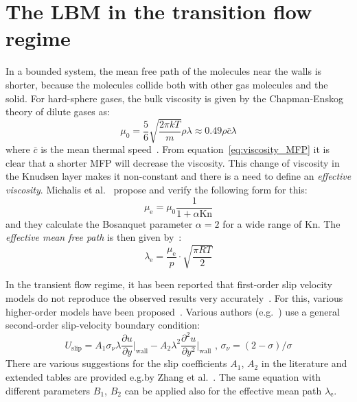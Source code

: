 \section{The LBM in the transition flow regime}
In a bounded system, the mean free path of the molecules near the walls is
shorter, because the molecules collide both with other gas molecules and the solid.
For hard-sphere gases, the bulk viscosity is given by the
Chapman-Enskog theory of dilute gases as:
\begin{equation}
 \mu_0 = \frac{5}{6} \sqrt{\frac{2\pi k T}{m}} \rho \lambda \approx 0.49 \rho \bar{c} \lambda
 \label{eq:viscosity_MFP}
\end{equation}
where $\bar{c}$ is the mean thermal speed~\cite{Michalis2010}. 
From equation~\ref{eq:viscosity_MFP} it is clear that a shorter MFP will decrease the viscosity.
This change of viscosity in the Knudsen layer makes it non-constant and there is a need
to define an \textit{effective viscosity}. Michalis et al.~\cite{Michalis2010} propose
and verify the following form for this:
\begin{equation}
 \mu_\mathrm{e} = \mu_0 \frac{1}{1 + \alpha \mathrm{Kn}}
\end{equation}
and they calculate the Bosanquet parameter $\alpha=2$ for a wide range of $\mathrm{Kn}$.
The \textit{effective mean free path} is then given by~\cite{Li2011}:
\begin{equation}
 \lambda_\mathrm{e} = \frac{\mu_\mathrm{e}}{p} \cdot \sqrt{\frac{\pi R T}{2}}
\end{equation}

In the transient flow regime, it has been reported that first-order slip velocity
models do not reproduce the observed results very accurately~\cite{Barber2006}.
For this, various higher-order models have been proposed~\cite{Zhang2012}.
Various authors (e.g.~\cite{Li2011, Neumann2012}) use a general second-order
slip-velocity boundary condition:
\begin{equation}
 U_\mathrm{slip} = A_1 \sigma_\nu \lambda \frac{\partial u}{\partial y} \Big|_\mathrm{wall} - A_2 \lambda^2 \frac{\partial^2 u}{\partial y^2} \Big|_\mathrm{wall} \textrm{ , \ } \sigma_\nu = (2 - \sigma)/\sigma
  \label{eq:slip2}
 \end{equation}
There are various suggestions for the slip coefficients $A_1$, $A_2$ in the literature
and extended tables are provided e.g.\@ by Zhang et al.~\cite{Zhang2012}.
The same equation with different parameters $B_1$, $B_2$ can be applied also for the effective
mean path $\lambda_\mathrm{e}$.

